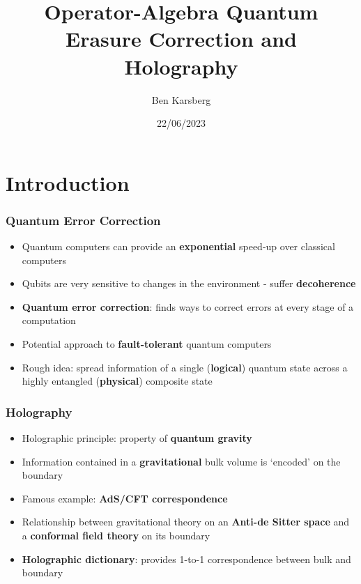 \documentclass[11pt]{beamer}
\begin{document}
	\author{Ben Karsberg}
	\title{Operator-Algebra Quantum Erasure Correction and Holography}
	\date{22/06/2023}
	\begin{frame}[plain]
		\maketitle
	\end{frame}
	
	\section[Introduction]{Introduction}
	
	\begin{frame}
		\frametitle{Quantum Error Correction}
		\begin{itemize}[<+->]
			\item Quantum computers can provide an \textbf{exponential} speed-up over classical computers
			\item Qubits are very sensitive to changes in the environment - suffer \textbf{decoherence}
			\item \textbf{Quantum error correction}: finds ways to correct errors at every stage of a computation
			\item Potential approach to \textbf{fault-tolerant} quantum computers
			\item Rough idea: spread information of a single (\textbf{logical}) quantum state across a highly entangled (\textbf{physical}) composite state
		\end{itemize}
	\end{frame}

	\begin{frame}
		\frametitle{Holography}
		\begin{itemize}[<+->]
			\item Holographic principle: property of \textbf{quantum gravity}
			\item Information contained in a \textbf{gravitational} bulk volume is `encoded' on the boundary
			\item Famous example: \textbf{AdS/CFT correspondence}
			\item Relationship between gravitational theory on an \textbf{Anti-de Sitter space} and a \textbf{conformal field theory} on its boundary
			\item \textbf{Holographic dictionary}: provides 1-to-1 correspondence between bulk and boundary
		\end{itemize}
	\end{frame}
\end{document}
